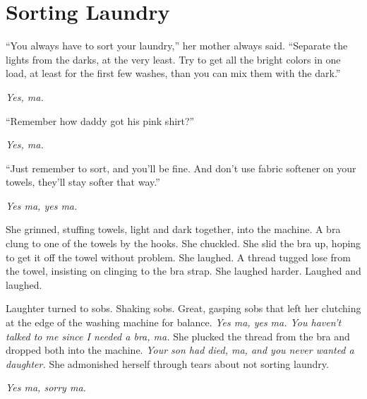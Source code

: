 \chapter{Sorting Laundry}

``You always have to sort your laundry,'' her mother always said. ``Separate the lights from the darks, at the very least. Try to get all the bright colors in one load, at least for the first few washes, than you can mix them with the dark.''

\emph{Yes, ma.}

``Remember how daddy got his pink shirt?''

\emph{Yes, ma.}

``Just remember to sort, and you'll be fine. And don't use fabric softener on your towels, they'll stay softer that way.''

\emph{Yes ma, yes ma.}

She grinned, stuffing towels, light and dark together, into the machine. A bra clung to one of the towels by the hooks. She chuckled. She slid the bra up, hoping to get it off the towel without problem. She laughed. A thread tugged lose from the towel, insisting on clinging to the bra strap. She laughed harder. Laughed and laughed.

Laughter turned to sobs. Shaking sobs. Great, gasping sobs that left her clutching at the edge of the washing machine for balance. \emph{Yes ma, yes ma. You haven't talked to me since I needed a bra, ma.} She plucked the thread from the bra and dropped both into the machine. \emph{Your son had died, ma, and you never wanted a daughter.} She admonished herself through tears about not sorting laundry.

\emph{Yes ma, sorry ma.}
